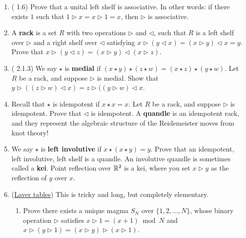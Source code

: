 \documentclass[11pt,paper=letter]{scrartcl}
\newcommand{\sleft}{\triangleright}
\newcommand{\sright}{\triangleleft}
\begin{document}
\begin{enumerate}
\item (\href{https://arxiv.org/pdf/1603.08590}{\!} 1.6) Prove that a unital left shelf is associative. In other words: if there exists $1$ such that $1 \sleft x = x \sleft 1 = x$, then $\sleft$ is associative.

\item A \textbf{rack} is a set $R$ with two operations $\sleft$ and $\sright$, such that $R$ is a left shelf over $\sleft$ and a right shelf over $\sright$ satisfying $
  x \sleft (y \sright x) = (x \sleft y) \sright x = y
$.
Prove that $x \sleft (y \sright z) = (x \sleft y) \sright (x \sleft z)$.

\item (\href{https://arxiv.org/pdf/1409.8396}{\!} 2.1.3) We say $\star$ is \textbf{medial} if $(x \star y) \star (z \star w) = (x \star z) \star (y \star w)$. Let $R$ be a rack, and suppose $\sleft$ is medial. Show that $y \sleft ((z \sleft w) \sright x) = z \sleft ((y \sleft w) \sright x$.

\item Recall that $\star$ is idempotent if $x \star x = x$. Let $R$ be a rack, and suppose $\sleft$ is idempotent. Prove that $\sright$ is idempotent. A \textbf{quandle} is an idempotent rack, and they represent the algebraic structure of the Reidemeister moves from knot theory!

\item We say $\star$ is \textbf{left involutive} if $x \star (x \star y) = y$. Prove that an idempotent, left involutive, left shelf is a quandle. An involutive quandle is sometimes called a \textbf{kei}. Point reflection over $\mathbb R^2$ is a kei, where you set $x \sleft y$ as the reflection of $y$ over $x$.

\item (\href{https://en.wikipedia.org/wiki/Laver_table}{Laver tables}) This is tricky and long, but completely elementary.

\begin{enumerate}
\item Prove there exists a unique magma $S_N$ over $\{1, 2, \ldots, N\}$, whose binary operation $\sleft$ satisfies $x \sleft 1 = (x + 1) \bmod N$ and $x \sleft (y \sleft 1) = (x \sleft y) \sleft (x \sleft 1)$.


\end{enumerate}
\end{enumerate}
\end{document}
